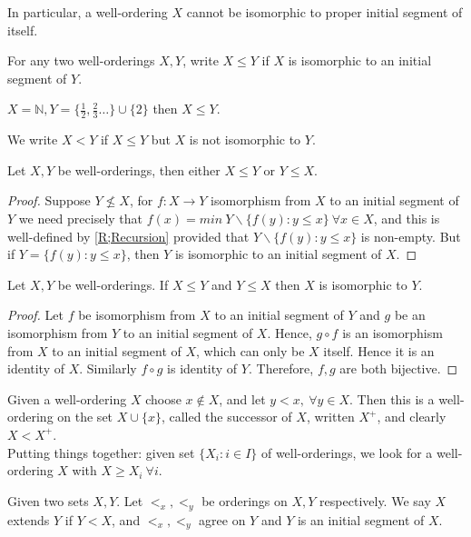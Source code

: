 \begin{remark}
In particular, a well-ordering $X$ cannot be isomorphic to proper
initial segment of itself.
\end{remark}
\begin{definition} For any two well-orderings $X,Y$, write $X \le Y$
if $X$ is isomorphic to an initial segment of $Y$.
\end{definition}
\begin{example} $X=\mathbb{N}, Y=\{\frac{1}{2},\frac{2}{3} \ldots\}
\cup \{2\}$ then $X \le Y$.
\end{example}
We write $X<Y$ if $X \le Y$ but $X$ is not isomorphic to $Y$.
\begin{proposition} Let $X,Y$ be well-orderings, then either
$X \le Y$ or $Y \le X$.
\end{proposition}
\begin{proof} Suppose $Y \not \le X$, for $f: X \rightarrow Y$
isomorphism from $X$ to an initial segment of $Y$ we need precisely
that $f(x)=min~Y \backslash \{f(y): y \le x\} ~\forall x \in X$,
and this is well-defined by \ref{R;Recursion} provided that
$Y \backslash \{f(y): y \le x\}$ is non-empty. But if
$Y = \{f(y): y \le x\}$, then $Y$ is isomorphic to an initial segment of $X$.
\end{proof}
\begin{proposition} Let $X,Y$ be well-orderings. If $X \le Y$
and $Y \le X$ then $X$ is isomorphic to $Y$.
\end{proposition}
\begin{proof} Let $f$ be isomorphism from $X$ to an initial segment
 of $Y$ and $g$ be an isomorphism from $Y$ to an initial segment
 of $X$. Hence, $g \circ f$ is an isomorphism from $X$ to an
 initial segment of $X$, which can only be $X$ itself.
 Hence it is an identity of $X$. Similarly $f \circ g$ is identity
  of $Y$. Therefore, $f, g$ are both bijective.
\end{proof}
Given a well-ordering $X$ choose $x \not \in X$, and let $y<x,
~\forall y \in X$. Then this is a well-ordering on the set
$X \cup \{x\}$, called the successor of $X$, written $X^+$, and clearly $X<X^+$.\\
Putting things together: given set $\{X_i: i \in I\}$ of well-orderings,
we look for a well-ordering $X$ with $X \ge X_i ~\forall i$.
\begin{definition} Given two sets $X,Y$. Let $<_x, <_y$ be orderings
on $X,Y$ respectively. We say $X$ extends $Y$ if $Y<X$, and $<_x,<_y$
agree on $Y$ and $Y$ is an initial segment of $X$.
\end{definition}
